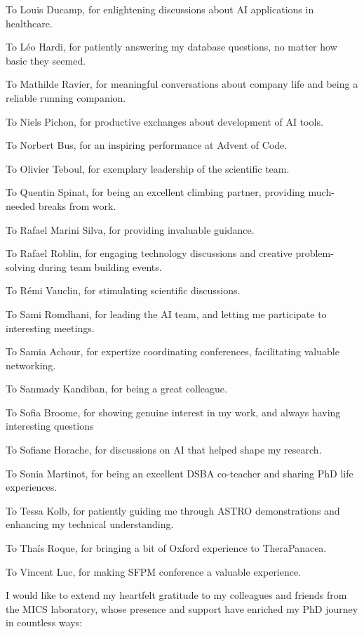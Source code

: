 To Louis Ducamp, for enlightening discussions about AI applications in healthcare.

To Léo Hardi, for patiently answering my database questions, no matter how basic they seemed.

To Mathilde Ravier, for meaningful conversations about company life and being a reliable running companion.

To Niels Pichon, for productive exchanges about development of AI tools.

To Norbert Bus, for an inspiring performance at Advent of Code.

To Olivier Teboul, for exemplary leadership of the scientific team.

To Quentin Spinat, for being an excellent climbing partner, providing much-needed breaks from work.

To Rafael Marini Silva, for providing invaluable guidance.

To Rafael Roblin, for engaging technology discussions and creative problem-solving during team building events.

To Rémi Vauclin, for stimulating scientific discussions.

To Sami Romdhani, for leading the AI team, and letting me participate to interesting meetings.

To Samia Achour, for expertize coordinating conferences, facilitating valuable networking.

To Sanmady Kandiban, for being a great colleague.

To Sofia Broome, for showing genuine interest in my work, and always having interesting questions

To Sofiane Horache, for discussions on AI that helped shape my research.

To Sonia Martinot, for being an excellent DSBA co-teacher and sharing PhD life experiences.

To Tessa Kolb, for patiently guiding me through ASTRO demonstrations and enhancing my technical understanding.

To Thaís Roque, for bringing a bit of Oxford experience to TheraPanacea.

To Vincent Luc, for making SFPM conference a valuable experience.



I would like to extend my heartfelt gratitude to my colleagues and friends from the MICS laboratory, whose presence and support have enriched my PhD journey in countless ways:

